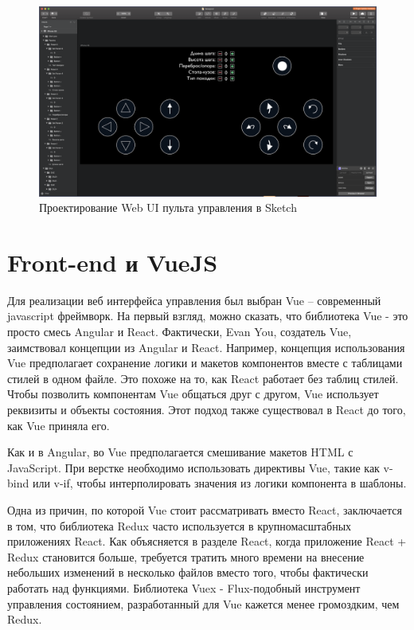 \begin{figure}[h!]
	\centering
	\includegraphics[width = \linewidth]{img/sketch}
	\caption{Проектирование Web UI пульта управления в Sketch}
	\label{img:sketch}
\end{figure}

\section{Front-end и VueJS}

Для реализации веб интерфейса управления был выбран Vue – современный javascript фреймворк. На первый взгляд, можно сказать, что библиотека Vue - это просто смесь Angular и React. Фактически, Evan You, создатель Vue, заимствовал концепции из Angular и React. Например, концепция использования Vue предполагает сохранение логики и макетов компонентов вместе с таблицами стилей в одном файле. Это похоже на то, как React работает без таблиц стилей. Чтобы позволить компонентам Vue общаться друг с другом, Vue использует реквизиты и объекты состояния. Этот подход также существовал в React до того, как Vue приняла его.

Как и в Angular, во Vue предполагается смешивание макетов HTML с JavaScript. При верстке необходимо использовать директивы Vue, такие как v-bind или v-if, чтобы интерполировать значения из логики компонента в шаблоны.

Одна из причин, по которой Vue стоит рассматривать вместо React, заключается в том, что библиотека Redux часто используется в крупномасштабных приложениях React. Как объясняется в разделе React, когда приложение React + Redux становится больше, требуется тратить много времени на внесение небольших изменений в несколько файлов вместо того, чтобы фактически работать над функциями. Библиотека Vuex - Flux-подобный инструмент управления состоянием, разработанный для Vue кажется менее громоздким, чем Redux.

